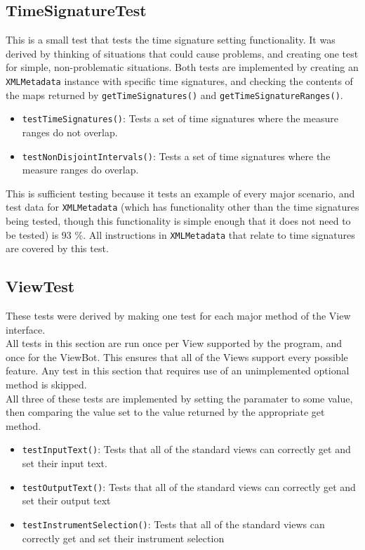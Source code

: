 \documentclass[11pt]{article}
\begin{document}
\subsection{TimeSignatureTest}
\label{sec:orgd836bcc}
This is a small test that tests the time signature setting functionality.  It was derived by thinking of situations that could cause problems, and creating one test for simple, non-problematic situations.  Both tests are implemented by creating an \texttt{XMLMetadata} instance with specific time signatures, and checking the contents of the maps returned by \texttt{getTimeSignatures()} and \texttt{getTimeSignatureRanges()}.\\
\begin{itemize}
\item \texttt{testTimeSignatures()}: Tests a set of time signatures where the measure ranges do not overlap.\\
\item \texttt{testNonDisjointIntervals()}: Tests a set of time signatures where the measure ranges do overlap.\\
\end{itemize}

This is sufficient testing because it tests an example of every major scenario, and test data for \texttt{XMLMetadata} (which has functionality other than the time signatures being tested, though this functionality is simple enough that it does not need to be tested) is 93 \%.  All instructions in \texttt{XMLMetadata} that relate to time signatures are covered by this test.\\
\subsection{ViewTest}
\label{sec:orge685cc0}
These tests were derived by making one test for each major method of the View interface.\\
All tests in this section are run once per View supported by the program, and once for the ViewBot.  This ensures that all of the Views support every possible feature.  Any test in this section that requires use of an unimplemented optional method is skipped.\\
All three of these tests are implemented by setting the paramater to some value, then comparing the value set to the value returned by the appropriate get method.\\
\begin{itemize}
\item \texttt{testInputText()}: Tests that all of the standard views can correctly get and set their input text.\\
\item \texttt{testOutputText()}: Tests that all of the standard views can correctly get and set their output text\\
\item \texttt{testInstrumentSelection()}: Tests that all of the standard views can correctly get and set their instrument selection\\
\end{itemize}
\end{document}
